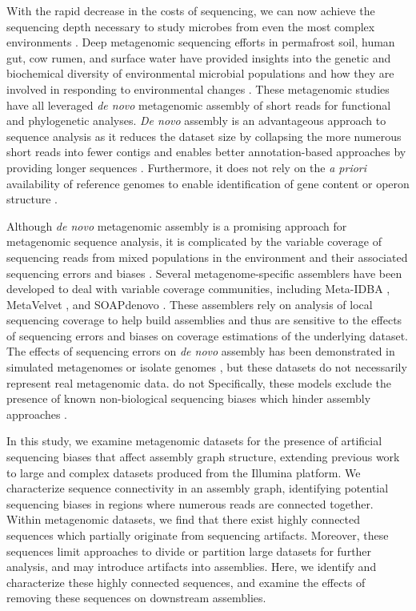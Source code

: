 \documentclass[10pt]{article}
\begin{document}
With the rapid decrease in the costs of sequencing, we can now achieve
the sequencing depth necessary to study microbes from even the most
complex environments \cite{Hess:2011p686,Qin:2010p189}.  Deep
metagenomic sequencing efforts in permafrost soil, human gut, cow
rumen, and surface water have provided insights into the genetic and
biochemical diversity of environmental microbial populations
\cite{Hess:2011p686,Iverson:2012p1281,Qin:2010p189} and how they are
involved in responding to environmental changes
\cite{Mackelprang:2011p1087}. These metagenomic studies have all
leveraged \emph{de novo} metagenomic assembly of short reads for
functional and phylogenetic analyses. \emph{De novo} assembly is an
advantageous approach to sequence analysis as it reduces the dataset
size by collapsing the more numerous short reads into fewer contigs
and enables better annotation-based approaches by providing longer
sequences \cite{Miller:2010p226,Pop:2009p798}. Furthermore, it does
not rely on the {\em a priori} availability of reference genomes to enable
identification of gene content or operon structure
\cite{Hess:2011p686,Iverson:2012p1281}.

Although \emph{de novo} metagenomic assembly is a promising approach
for metagenomic sequence analysis, it is complicated by the variable
coverage of sequencing reads from mixed populations in the environment
and their associated sequencing errors and biases
\cite{Mende:2012p1262,Pignatelli:2011p742}. Several
metagenome-specific assemblers have been developed to deal with
variable coverage communities, including Meta-IDBA
\cite{Peng:2011p898}, MetaVelvet \cite{Namiki:2012iq}, and SOAPdenovo \cite{Li:2010p234}.  These
assemblers rely on analysis of local sequencing coverage to help build
assemblies and thus are sensitive to the effects of sequencing errors
and biases on coverage estimations of the underlying dataset. The
effects of sequencing errors on \emph{de novo} assembly has been
demonstrated in simulated metagenomes
\cite{Mavromatis:2006p894,Mende:2012p1262,Pignatelli:2011p742} or
isolate genomes \cite{Morgan:2010p740,Chitsaz:2011kr}, but these datasets do not necessarily represent real metagenomic
data. do not Specifically, these models exclude the presence of known
non-biological sequencing biases which hinder assembly approaches
\cite{GomezAlvarez:2009p1334,Keegan:2012p1336,Niu:2010p1333}.

In this study, we examine metagenomic datasets for the presence of
artificial sequencing biases that affect assembly graph structure,
extending previous work to large and complex datasets produced from
the Illumina platform. We characterize sequence connectivity in an
assembly graph, identifying potential sequencing biases in regions
where numerous reads are connected together.  Within metagenomic
datasets, we find that there exist highly connected sequences which
partially originate from sequencing artifacts.  Moreover, these
sequences limit approaches to divide or partition large datasets for
further analysis, and may introduce artifacts into assemblies.  Here,
we identify and characterize these highly connected sequences, and
examine the effects of removing these sequences on downstream
assemblies.
\end{document}
